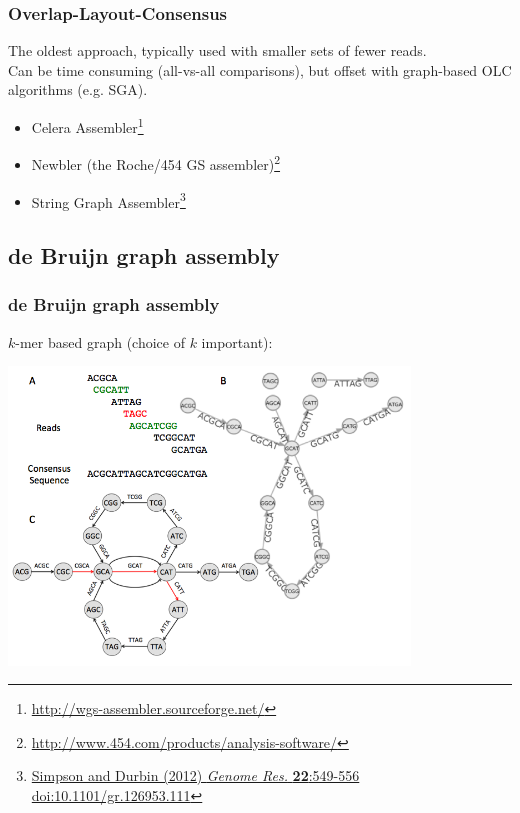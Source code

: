 \begin{frame}
  \frametitle{Overlap-Layout-Consensus}
  The oldest approach, typically used with smaller sets of fewer reads. \\[0.5cm]
  Can be time consuming (all-vs-all comparisons), but offset with graph-based OLC algorithms (e.g. SGA).\\[0.5cm]
  \begin{itemize}
    \item Celera Assembler\footnote{\tiny{\href{http://wgs-assembler.sourceforge.net/}{http://wgs-assembler.sourceforge.net/}}}
    \item Newbler (the Roche/454 GS assembler)\footnote{\tiny{\href{http://www.454.com/products/analysis-software/}{http://www.454.com/products/analysis-software/}}}
    \item String Graph Assembler\footnote{\tiny{\href{http://dx.doi.org/10.1101/gr.126953.111}{Simpson and Durbin (2012) \textit{Genome Res.} \textbf{22}:549-556 doi:10.1101/gr.126953.111}}}
  \end{itemize}
\end{frame}

\subsection{de Bruijn graph assembly}

\begin{frame}
  \frametitle{de Bruijn graph assembly}
  $k$-mer based graph (choice of $k$ important):
  \begin{center}
    \includegraphics[width=0.8\textwidth]{images/deBruijn3}
  \end{center}  
\end{frame}

